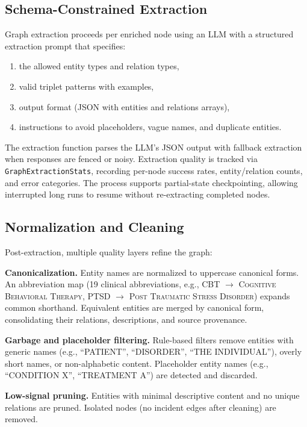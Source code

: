 \documentclass[12pt,a4paper]{article}
\begin{document}
\subsection{Schema-Constrained Extraction}

Graph extraction proceeds per enriched node using an LLM with a structured extraction prompt that specifies:
\begin{enumerate}[nosep]
    \item the allowed entity types and relation types,
    \item valid triplet patterns with examples,
    \item output format (JSON with entities and relations arrays),
    \item instructions to avoid placeholders, vague names, and duplicate entities.
\end{enumerate}

The extraction function parses the LLM's JSON output with fallback extraction when responses are fenced or noisy. Extraction quality is tracked via \texttt{GraphExtractionStats}, recording per-node success rates, entity/relation counts, and error categories. The process supports partial-state checkpointing, allowing interrupted long runs to resume without re-extracting completed nodes.

\subsection{Normalization and Cleaning}

Post-extraction, multiple quality layers refine the graph:

\textbf{Canonicalization.} Entity names are normalized to uppercase canonical forms. An abbreviation map (19 clinical abbreviations, e.g., CBT $\rightarrow$ \textsc{Cognitive Behavioral Therapy}, PTSD $\rightarrow$ \textsc{Post Traumatic Stress Disorder}) expands common shorthand. Equivalent entities are merged by canonical form, consolidating their relations, descriptions, and source provenance.

\textbf{Garbage and placeholder filtering.} Rule-based filters remove entities with generic names (e.g., ``PATIENT'', ``DISORDER'', ``THE INDIVIDUAL''), overly short names, or non-alphabetic content. Placeholder entity names (e.g., ``CONDITION X'', ``TREATMENT A'') are detected and discarded.

\textbf{Low-signal pruning.} Entities with minimal descriptive content and no unique relations are pruned. Isolated nodes (no incident edges after cleaning) are removed.
\end{document}
